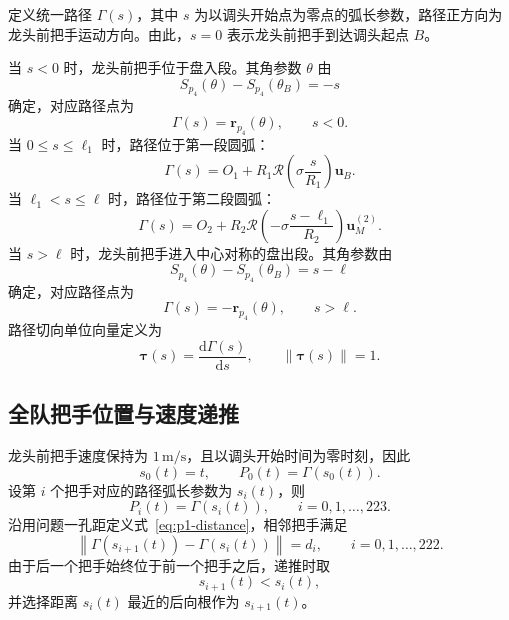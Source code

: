 定义统一路径 $\Gamma(s)$，其中 $s$ 为以调头开始点为零点的弧长参数，路径正方向为龙头前把手运动方向。由此，$s=0$ 表示龙头前把手到达调头起点 $B$。

当 $s<0$ 时，龙头前把手位于盘入段。其角参数 $\theta$ 由
\begin{equation}
    S_{p_4}(\theta)-S_{p_4}(\theta_B)=-s
    \label{eq:p4-in-theta}
\end{equation}
确定，对应路径点为
\begin{equation}
    \Gamma(s)=\bm r_{p_4}(\theta),\qquad s<0.
    \label{eq:p4-path-in}
\end{equation}
当 $0\le s\le\ell_1$ 时，路径位于第一段圆弧：
\begin{equation}
    \Gamma(s)=O_1+R_1\mathcal R\!\left(\sigma\frac{s}{R_1}\right)\bm u_B.
    \label{eq:p4-path-arc1}
\end{equation}
当 $\ell_1<s\le\ell$ 时，路径位于第二段圆弧：
\begin{equation}
    \Gamma(s)=O_2+R_2\mathcal R\!\left(-\sigma\frac{s-\ell_1}{R_2}\right)\bm u_M^{(2)}.
    \label{eq:p4-path-arc2}
\end{equation}
当 $s>\ell$ 时，龙头前把手进入中心对称的盘出段。其角参数由
\begin{equation}
    S_{p_4}(\theta)-S_{p_4}(\theta_B)=s-\ell
    \label{eq:p4-out-theta}
\end{equation}
确定，对应路径点为
\begin{equation}
    \Gamma(s)=-\bm r_{p_4}(\theta),\qquad s>\ell.
    \label{eq:p4-path-out}
\end{equation}
路径切向单位向量定义为
\begin{equation}
    \bm\tau(s)=\frac{\mathrm d\Gamma(s)}{\mathrm ds},\qquad \|\bm\tau(s)\|=1.
    \label{eq:p4-path-tangent}
\end{equation}

\subsection{全队把手位置与速度递推}

龙头前把手速度保持为 $1\,\mathrm{m/s}$，且以调头开始时间为零时刻，因此
\begin{equation}
    s_0(t)=t,\qquad P_0(t)=\Gamma(s_0(t)).
    \label{eq:p4-head-s}
\end{equation}
设第 $i$ 个把手对应的路径弧长参数为 $s_i(t)$，则
\begin{equation}
    P_i(t)=\Gamma(s_i(t)),\qquad i=0,1,\ldots,223.
    \label{eq:p4-handle-position}
\end{equation}
沿用问题一孔距定义式~\eqref{eq:p1-distance}，相邻把手满足
\begin{equation}
    \left\|\Gamma(s_{i+1}(t))-\Gamma(s_i(t))\right\|=d_i,
    \qquad i=0,1,\ldots,222.
    \label{eq:p4-distance-constraint}
\end{equation}
由于后一个把手始终位于前一个把手之后，递推时取
\begin{equation}
    s_{i+1}(t)<s_i(t),
    \label{eq:p4-order}
\end{equation}
并选择距离 $s_i(t)$ 最近的后向根作为 $s_{i+1}(t)$。


